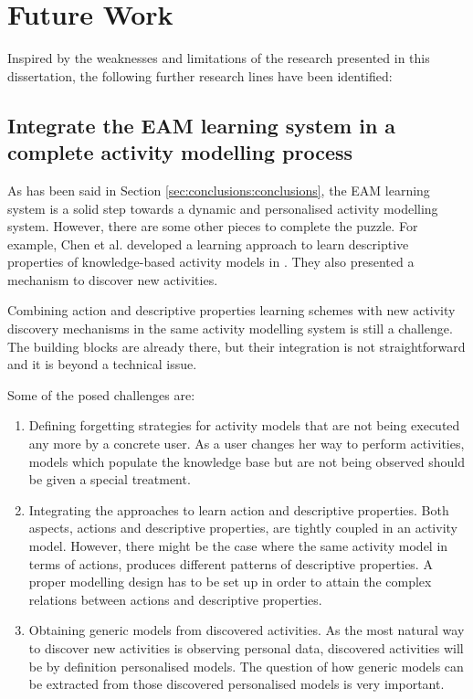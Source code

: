 \section{Future Work}
\label{sec:conclusions:future}

Inspired by the weaknesses and limitations of the research presented in this dissertation, the following further research lines have been identified:

\subsection{Integrate the EAM learning system in a complete activity modelling process}

As has been said in Section \ref{sec:conclusions:conclusions}, the EAM learning system is a solid step towards a dynamic and personalised activity modelling system. However, there are some other pieces to complete the puzzle. For example, Chen et al. developed a learning approach to learn descriptive properties of knowledge-based activity models in \cite{Chen2014}. They also presented a mechanism to discover new activities.

Combining action and descriptive properties learning schemes with new activity discovery mechanisms in the same activity modelling system is still a challenge. The building blocks are already there, but their integration is not straightforward and it is beyond a technical issue. 

Some of the posed challenges are:

\begin{enumerate}
 \item Defining forgetting strategies for activity models that are not being executed any more by a concrete user. As a user changes her way to perform activities, models which populate the knowledge base but are not being observed should be given a special treatment.
 \item Integrating the approaches to learn action and descriptive properties. Both aspects, actions and descriptive properties, are tightly coupled in an activity model. However, there might be the case where the same activity model in terms of actions, produces different patterns of descriptive properties. A proper modelling design has to be set up in order to attain the complex relations between actions and descriptive properties.
 \item Obtaining generic models from discovered activities. As the most natural way to discover new activities is observing personal data, discovered activities will be by definition personalised models. The question of how generic models can be extracted from those discovered personalised models is very important.
\end{enumerate}


